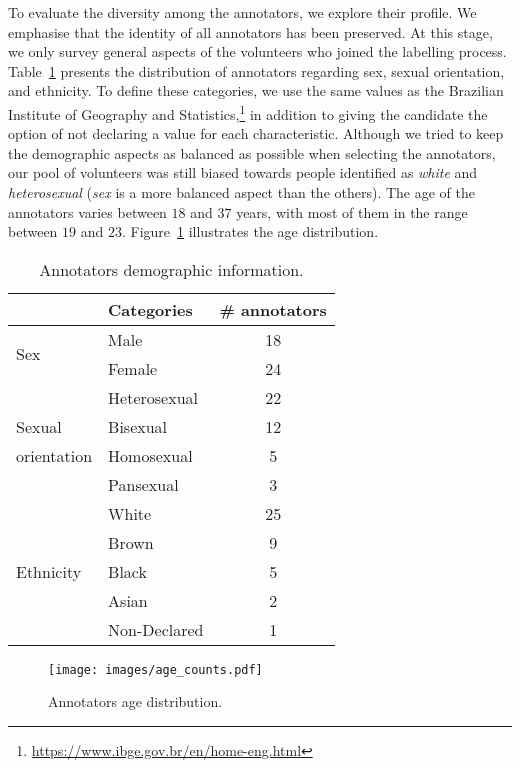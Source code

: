 \documentclass[11pt,a4paper]{article}
\begin{document}
To evaluate the diversity among the annotators, we explore their profile. We emphasise that the identity of all annotators has been preserved. At this stage, we only survey general aspects of the volunteers who joined the labelling process.
Table~\ref{tab:demographics} presents the distribution of annotators regarding sex, sexual orientation, and ethnicity. To define these categories, we use the same values as the Brazilian Institute of Geography and Statistics,\footnote{\url{https://www.ibge.gov.br/en/home-eng.html}} in addition to giving the candidate the option of not declaring a value for each characteristic. Although we tried to keep the demographic aspects as balanced as possible when selecting the annotators, our pool of volunteers was still biased towards people identified as \textit{white} and \textit{heterosexual} (\textit{sex} is a more balanced aspect than the others). The age of the annotators varies between $18$ and $37$ years, with most of them in the range between $19$ and $23$. Figure~\ref{fig:age} illustrates the age distribution.

\begin{table}[ht]
\centering
\setlength{\tabcolsep}{1pt}
\begin{tabular}{p{2cm}lc}
\toprule
& Categories & \# annotators                                                \\ \bottomrule
\multirow{2}{*}{Sex} & Male & 18 \\  
& Female & 24    \\ \midrule

& Heterosexual & 22 \\ 
Sexual & Bisexual & 12 \\ 
orientation & Homosexual & 5 \\ 
& Pansexual &  3\\ \midrule

\multirow{5}{*}{Ethnicity}                                                     & White & 25 \\ 
& Brown & 9 \\ 
& Black & 5 \\ 
& Asian & 2\\ 
& Non-Declared & 1  \\ \bottomrule
\end{tabular}
\caption{Annotators demographic information.}\label{tab:demographics}
\end{table}

\begin{figure}[ht]
\centering
\texttt{[image: images/age\_counts.pdf]}
\caption{Annotators age distribution.}
\label{fig:age}
\end{figure}
\end{document}

